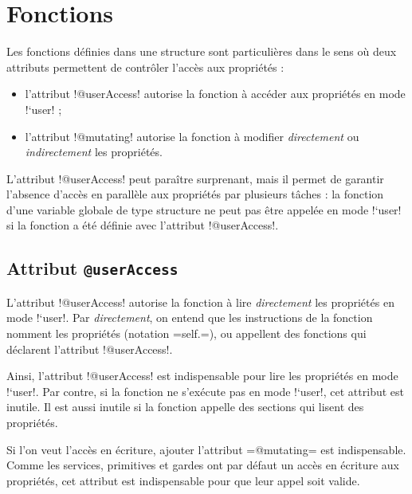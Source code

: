 \section{Fonctions}

Les fonctions définies dans une structure sont particulières dans le sens où deux attributs permettent de contrôler l'accès aux propriétés :
\begin{itemize}
\item l'attribut \plm!@userAccess! autorise la fonction à accéder aux propriétés en mode \plm!`user! ;
\item l'attribut \plm!@mutating! autorise la fonction à modifier \emph{directement} ou \emph{indirectement} les propriétés.
\end{itemize}

L'attribut \plm!@userAccess! peut paraître surprenant, mais il permet de garantir l'absence d'accès en parallèle aux propriétés par plusieurs tâches : la fonction d'une variable globale de type structure ne peut pas être appelée en mode \plm!`user! si la fonction a été définie avec l'attribut  \plm!@userAccess!.

\subsection{Attribut \texttt{@userAccess}}

L'attribut \plm!@userAccess! autorise la fonction à lire \emph{directement} les propriétés en mode \plm!`user!. Par \emph{directement}, on entend que les instructions de la fonction nomment les propriétés (notation \plm=self.=), ou appellent des fonctions qui déclarent l'attribut \plm!@userAccess!.

Ainsi, l'attribut \plm!@userAccess! est indispensable pour lire les propriétés en mode \plm!`user!. Par contre, si la fonction ne s'exécute pas en mode \plm!`user!, cet attribut est inutile. Il est aussi inutile si la fonction appelle des sections qui lisent des propriétés.

Si l'on veut l'accès en écriture, ajouter l'attribut \plm=@mutating= est indispensable. Comme les services, primitives et gardes ont par défaut un accès en écriture aux propriétés, cet attribut est indispensable pour que leur appel soit valide. 


